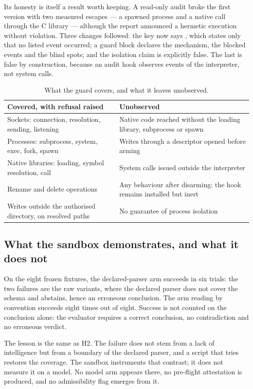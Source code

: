 Its honesty is itself a result worth keeping. A read-only audit broke the first
version with two measured escapes --- a spawned process and a native call through
the C library --- although the report announced a hermetic execution without
violation. Three changes followed: the key now says , which
states only that no listed event occurred; a guard block declares the mechanism,
the blocked events and the blind spots; and the isolation claim is explicitly
false. The last is false by construction, because an audit hook observes events of
the interpreter, not system calls.

\begin{table}[H]
\centering
\caption{What the guard covers, and what it leaves unobserved.}
\label{tab:guard-limits}
\small
\begin{tabular}{@{}p{6.2cm}p{7.6cm}@{}}
\toprule
Covered, with refusal raised & Unobserved \\
\midrule
Sockets: connection, resolution, sending, listening & Native code reached without the loading library, subprocess or spawn \\
Processes: subprocess, system, exec, fork, spawn & Writes through a descriptor opened before arming \\
Native libraries: loading, symbol resolution, call & System calls issued outside the interpreter \\
Rename and delete operations & Any behaviour after disarming: the hook remains installed but inert \\
Writes outside the authorised directory, on resolved paths & No guarantee of process isolation \\
\bottomrule
\end{tabular}
\end{table}

\subsection{What the sandbox demonstrates, and what it does not}

On the eight frozen fixtures, the declared-parser arm succeeds in six trials: the
two failures are the raw variants, where the declared parser does not cover the
schema and abstains, hence an erroneous conclusion. The arm reading by convention
succeeds eight times out of eight. Success is not counted on the conclusion alone:
the evaluator requires a correct conclusion, no contradiction and no erroneous
verdict.

The lesson is the same as H2. The failure does not stem from a lack of
intelligence but from a boundary of the declared parser, and a script that tries
restores the coverage. The sandbox instruments that contrast; it does not measure
it on a model. No model arm appears there, no pre-flight attestation is produced,
and no admissibility flag emerges from it.


